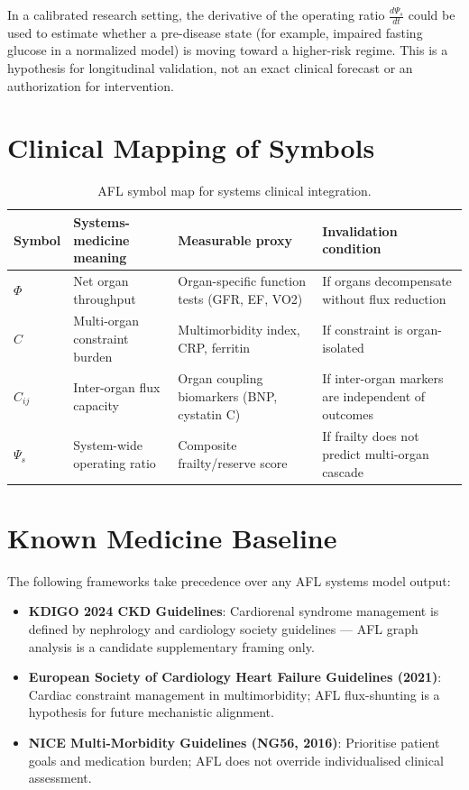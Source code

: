 \documentclass[11pt]{article}
\begin{document}
In a calibrated research setting, the derivative of the operating ratio $\frac{d\Psi_s}{dt}$ could be used to estimate whether a pre-disease state (for example, impaired fasting glucose in a normalized model) is moving toward a higher-risk regime. This is a hypothesis for longitudinal validation, not an exact clinical forecast or an authorization for intervention.

\section{Clinical Mapping of Symbols}

\begin{table}[h!]
\centering
\caption{AFL symbol map for systems clinical integration.}
\begin{tabular}{llll}
\toprule
\textbf{Symbol} & \textbf{Systems-medicine meaning} & \textbf{Measurable proxy} & \textbf{Invalidation condition} \\
\midrule
$\Phi$ & Net organ throughput & Organ-specific function tests (GFR, EF, VO2) & If organs decompensate without flux reduction \\
$C$ & Multi-organ constraint burden & Multimorbidity index, CRP, ferritin & If constraint is organ-isolated \\
$C_{ij}$ & Inter-organ flux capacity & Organ coupling biomarkers (BNP, cystatin C) & If inter-organ markers are independent of outcomes \\
$\Psi_s$ & System-wide operating ratio & Composite frailty/reserve score & If frailty does not predict multi-organ cascade \\
\bottomrule
\end{tabular}
\end{table}

\section{Known Medicine Baseline}

The following frameworks take precedence over any AFL systems model output:
\begin{itemize}
  \item \textbf{KDIGO 2024 CKD Guidelines}: Cardiorenal syndrome management is defined by nephrology and cardiology society guidelines --- AFL graph analysis is a candidate supplementary framing only.
  \item \textbf{European Society of Cardiology Heart Failure Guidelines (2021)}: Cardiac constraint management in multimorbidity; AFL flux-shunting is a hypothesis for future mechanistic alignment.
  \item \textbf{NICE Multi-Morbidity Guidelines (NG56, 2016)}: Prioritise patient goals and medication burden; AFL does not override individualised clinical assessment.
\end{itemize}
\end{document}
